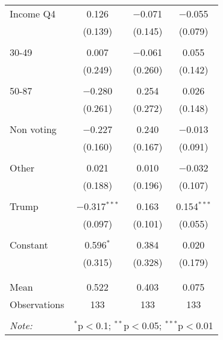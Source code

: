 \begin{tabular}{@{\extracolsep{5pt}}lccc}
 Income Q4 & 0.126 & $-$0.071 & $-$0.055 \\ 
  & (0.139) & (0.145) & (0.079) \\ 
  & & & \\ 
 30-49 & 0.007 & $-$0.061 & 0.055 \\ 
  & (0.249) & (0.260) & (0.142) \\ 
  & & & \\ 
 50-87 & $-$0.280 & 0.254 & 0.026 \\ 
  & (0.261) & (0.272) & (0.148) \\ 
  & & & \\ 
 Non voting & $-$0.227 & 0.240 & $-$0.013 \\ 
  & (0.160) & (0.167) & (0.091) \\ 
  & & & \\ 
 Other & 0.021 & 0.010 & $-$0.032 \\ 
  & (0.188) & (0.196) & (0.107) \\ 
  & & & \\ 
 Trump & $-$0.317$^{***}$ & 0.163 & 0.154$^{***}$ \\ 
  & (0.097) & (0.101) & (0.055) \\ 
  & & & \\ 
 Constant & 0.596$^{*}$ & 0.384 & 0.020 \\ 
  & (0.315) & (0.328) & (0.179) \\ 
  & & & \\ 
\hline \\[-1.8ex] 
Mean & 0.522 & 0.403 & 0.075 \\ 
Observations & 133 & 133 & 133 \\ 
\hline 
\hline \\[-1.8ex] 
\textit{Note:}  & \multicolumn{3}{r}{$^{*}$p$<$0.1; $^{**}$p$<$0.05; $^{***}$p$<$0.01} \\ 
\end{tabular} 
